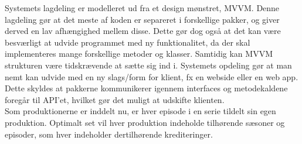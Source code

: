 Systemets lagdeling er modelleret ud fra et design mønstret, MVVM. Denne lagdeling gør at det meste af koden er separeret i forskellige pakker, og giver derved en lav afhængighed mellem disse. Dette gør dog også at det kan være besværligt at udvide programmet med ny funktionalitet, da der skal implementeres mange forskellige metoder og klasser. Samtidig kan MVVM strukturen være tidskrævende at sætte sig ind i. Systemets opdeling gør at man nemt kan udvide med en ny slags/form for klient, fx en webside eller en web app. Dette skyldes at pakkerne kommunikerer igennem interfaces og metodekaldene foregår til API'et, hvilket gør det muligt at udskifte klienten. \\
Som produktionerne er inddelt nu, er hver episode i en serie tildelt sin egen produktion. Optimalt set vil hver produktion indeholde tilhørende sæsoner og episoder, som hver indeholder dertilhørende krediteringer. 


